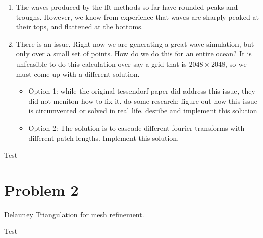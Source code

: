 \documentclass{article}
\begin{document}
\begin{enumerate}
        \item The waves produced by the fft methods so far have rounded peaks and troughs. However, we know from experience that waves are sharply peaked at their tops, and flattened at the bottoms.

        \item There is an issue. Right now we are generating a great wave simulation, but only over a small set of points. How do we do this for an entire ocean? It is unfeasible to do this calculation over say a grid that is $2048 \times 2048$, so we must come up with a different solution.

        \begin{itemize}
            \item Option 1: while the original tessendorf paper did address this issue, they did not meniton how to fix it.  do some research: figure out how this issue is circumvented or solved in real life. desribe and implement this solution
            \item Option 2: The solution is to cascade different fourier transforms with different patch lengths. Implement this solution. 
        \end{itemize}





        
    \end{enumerate}

    

\begin{tcolorbox}[enhanced,interior style={top color=Dandelion!20,bottom color=Dandelion!30}]
    Test
\end{tcolorbox}

\section*{Problem 2}
    Delauney Triangulation for mesh refinement.

\begin{tcolorbox}[enhanced,interior style={top color=Dandelion!20,bottom color=Dandelion!30}]
    Test
\end{tcolorbox}
\end{document}
